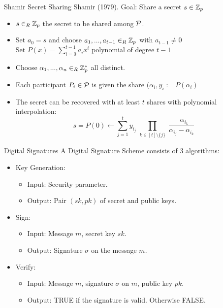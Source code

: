 \begin{frame}{Shamir Secret Sharing}
Shamir (1979). Goal: Share a secret $s \in {\mathbb Z}_p$

\begin{itemize}
\item $s \in_R {\mathbb Z}_p$ the secret to be shared among ${\mathcal P}$.
\item Set $a_0 = s$ and choose $a_1, ... , a_{t-1} \in_R {\mathbb Z}_p$ with $a_{t-1} \neq 0$ \\
        Set $P(x) = \sum_{i=0}^{t-1} a_i x^i$ polynomial of degree $t-1$
\item Choose $\alpha_1, ..., \alpha_n \in_R {\mathbb Z}_p^\ast$ all distinct.
\item Each participant $P_i \in {\mathcal P}$ is given the share $(\alpha_i, y_i := P(\alpha_i)$
\item The secret can be recovered with at least $t$ shares with polynomial interpolation:
$$ s = P(0) \leftarrow \sum_{j=1}^t y_{i_j} \prod_{\substack{k \in [t] \setminus \{j\}}} \frac{-\alpha_{i_k}}{\alpha_{i_j}-\alpha_{i_k}}$$
\end{itemize}


\end{frame}

\begin{frame}{Digital Signatures}
A Digital Signature Scheme consists of 3 algorithms:
\begin{itemize}
\item Key Generation:
	\begin{itemize}
	    \item Input: Security parameter.
	    \item Output: Pair $(sk,pk)$ of secret and public keys.
	\end{itemize}
\item Sign:
	\begin{itemize}
	    \item Input: Message $m$, secret key $sk$.
	    \item Output: Signature $\sigma$ on the message $m$.
	\end{itemize}
\item Verify:
	\begin{itemize}
	    \item Input: Message $m$, signature $\sigma$ on $m$, public key $pk$.
	    \item Output: TRUE if the signature is valid. Otherwise FALSE.
	\end{itemize}
\end{itemize}
\end{frame}

